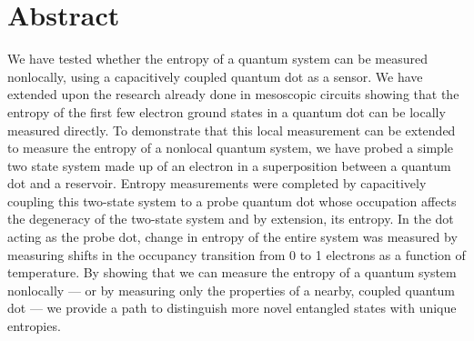 
\chapter{Abstract}

We have tested whether the entropy of a quantum system can be measured nonlocally, using a capacitively coupled quantum dot as a sensor. We have extended upon the research already done in mesoscopic circuits showing that the entropy of the first few electron ground states in a quantum dot can be locally measured directly. To demonstrate that this local measurement can be extended to measure the entropy of a nonlocal quantum system, we have probed a simple two state system made up of an electron in a superposition between a quantum dot and a reservoir. Entropy measurements were completed by capacitively coupling this two-state system to a probe quantum dot whose occupation affects the degeneracy of the two-state system and by extension, its entropy. In the dot acting as the probe dot, change in entropy of the entire system was measured by measuring shifts in the occupancy transition from 0 to 1 electrons as a function of temperature. By showing that we can measure the entropy of a quantum system nonlocally — or by measuring only the properties of a nearby, coupled quantum dot — we provide a path to distinguish more novel entangled states with unique entropies.

